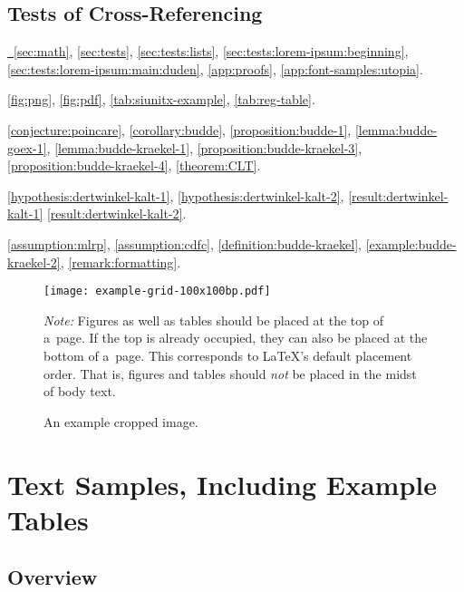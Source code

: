 \documentclass[12pt, a4paper, oneside]{article}
\newlength{\footnotelinespacing}
\newlength{\fsfootnote}
\let \footnotesizeOrig \footnotesize
\renewcommand{\footnotesize}{\footnotesizeOrig\fontsize{\fsfootnote}{\footnotelinespacing}\selectfont}
\renewcommand{\caps}[1]{{\textscale{0.97}{\textls[50]{\MakeUppercase{#1}}}}}
\newenvironment{figurenotes}[1][Note]
	{\par\justifying\medskip\begingroup\footnotesize\noindent\strut\textit{#1:} \ignorespaces}
	{\par\endgroup}
\theoremstyle{Plain}
\theoremstyle{Definition}
\theoremstyle{Remark}
\begin{document}
\subsection{Tests of Cross-Referencing}

\hyperref[sec:math]{\titlecap{\sectionautorefname}~\ref{sec:math}}, \autoref{sec:tests}, \autoref{sec:tests:lists}, \autoref{sec:tests:lorem-ipsum:beginning}, \autoref{sec:tests:lorem-ipsum:main:duden}, \autoref{app:proofs}, \autoref{app:font-samples:utopia}.

\autoref{fig:png}, \autoref{fig:pdf}, \autoref{tab:siunitx-example}, \autoref{tab:reg-table}.

\autoref{conjecture:poincare}, \autoref{corollary:budde}, \autoref{proposition:budde-1}, \autoref{lemma:budde-goex-1}, \autoref{lemma:budde-kraekel-1}, \autoref{proposition:budde-kraekel-3}, \autoref{proposition:budde-kraekel-4}, \autoref{theorem:CLT}.

\autoref{hypothesis:dertwinkel-kalt-1}, \autoref{hypothesis:dertwinkel-kalt-2}, \autoref{result:dertwinkel-kalt-1} \autoref{result:dertwinkel-kalt-2}.

\autoref{assumption:mlrp}, \autoref{assumption:cdfc}, \autoref{definition:budde-kraekel}, \autoref{example:budde-kraekel-2}, \autoref{remark:formatting}.

\begin{figure}[t]
	\texttt{[image: example-grid-100x100bp.pdf]}%
	\caption{An example cropped \caps{PDF} image.}
	\label{fig:pdf}
	\begin{figurenotes}
		Figures as well as tables should be placed at the top of a~page. If the top is already occupied, they can also be placed at the bottom of a~page. This corresponds to LaTeX's default placement order. That is, figures and tables should \emph{not} be placed in the midst of body text.
	\end{figurenotes}
\end{figure}


\section{Text Samples, Including Example Tables}

\subsection{Overview}
\end{document}
